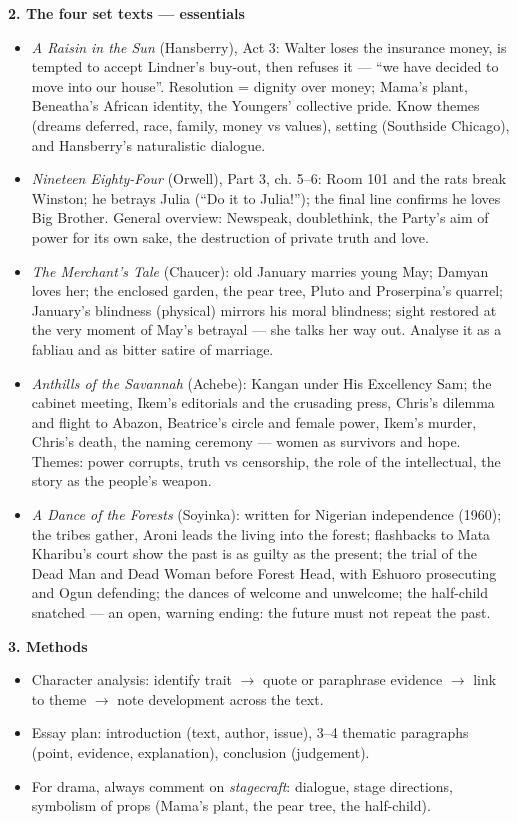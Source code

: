 \documentclass[11pt]{article}
\begin{document}
\begin{bilan}
\textbf{2. The four set texts — essentials}
\begin{itemize}
\item \emph{A Raisin in the Sun} (Hansberry), Act 3: Walter loses the insurance money, is tempted to accept Lindner's buy-out, then refuses it — ``we have decided to move into our house''. Resolution = dignity over money; Mama's plant, Beneatha's African identity, the Youngers' collective pride. Know themes (dreams deferred, race, family, money vs values), setting (Southside Chicago), and Hansberry's naturalistic dialogue.
\item \emph{Nineteen Eighty-Four} (Orwell), Part 3, ch. 5--6: Room 101 and the rats break Winston; he betrays Julia (``Do it to Julia!''); the final line confirms he loves Big Brother. General overview: Newspeak, doublethink, the Party's aim of power for its own sake, the destruction of private truth and love.
\item \emph{The Merchant's Tale} (Chaucer): old January marries young May; Damyan loves her; the enclosed garden, the pear tree, Pluto and Proserpina's quarrel; January's blindness (physical) mirrors his moral blindness; sight restored at the very moment of May's betrayal — she talks her way out. Analyse it as a fabliau and as bitter satire of marriage.
\item \emph{Anthills of the Savannah} (Achebe): Kangan under His Excellency Sam; the cabinet meeting, Ikem's editorials and the crusading press, Chris's dilemma and flight to Abazon, Beatrice's circle and female power, Ikem's murder, Chris's death, the naming ceremony — women as survivors and hope. Themes: power corrupts, truth vs censorship, the role of the intellectual, the story as the people's weapon.
\item \emph{A Dance of the Forests} (Soyinka): written for Nigerian independence (1960); the tribes gather, Aroni leads the living into the forest; flashbacks to Mata Kharibu's court show the past is as guilty as the present; the trial of the Dead Man and Dead Woman before Forest Head, with Eshuoro prosecuting and Ogun defending; the dances of welcome and unwelcome; the half-child snatched — an open, warning ending: the future must not repeat the past.
\end{itemize}

\textbf{3. Methods}
\begin{itemize}
\item Character analysis: identify trait $\rightarrow$ quote or paraphrase evidence $\rightarrow$ link to theme $\rightarrow$ note development across the text.
\item Essay plan: introduction (text, author, issue), 3--4 thematic paragraphs (point, evidence, explanation), conclusion (judgement).
\item For drama, always comment on \emph{stagecraft}: dialogue, stage directions, symbolism of props (Mama's plant, the pear tree, the half-child).
\end{itemize}


\end{bilan}
\end{document}
